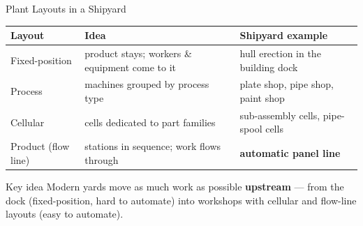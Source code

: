 \documentclass[aspectratio=169]{beamer}
\begin{document}
	\begin{frame}{Plant Layouts in a Shipyard}
		\renewcommand{\arraystretch}{1.3}
		\centering
		\small
		\begin{tabular}{@{}>{\raggedright}p{2.8cm}>{\raggedright}p{4.6cm}>{\raggedright\arraybackslash}p{5.2cm}@{}}
			\toprule
			\textbf{Layout} & \textbf{Idea} & \textbf{Shipyard example} \\
			\midrule
			Fixed-position   & product stays; workers \& equipment come to it & hull erection in the building dock \\
			Process          & machines grouped by process type & plate shop, pipe shop, paint shop \\
			Cellular         & cells dedicated to part families & sub-assembly cells, pipe-spool cells \\
			Product (flow line) & stations in sequence; work flows through & \textbf{automatic panel line} \\
			\bottomrule
		\end{tabular}
		\vspace{0.3cm}
		\begin{block}{Key idea}
			\small Modern yards move as much work as possible \textbf{upstream} --- from the dock (fixed-position, hard to automate) into workshops with cellular and flow-line layouts (easy to automate).
		\end{block}
	\end{frame}

\end{document}
